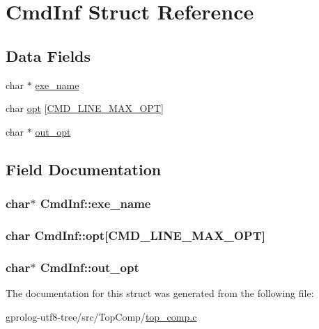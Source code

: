 \hypertarget{structCmdInf}{}\section{Cmd\+Inf Struct Reference}
\label{structCmdInf}
\subsection*{Data Fields}
\begin{DoxyCompactItemize}
\item 
char $\ast$ \hyperlink{structCmdInf_a08f467c4c99d5989d79d571d71eb91cc}{exe\+\_\+name}
\item 
char \hyperlink{structCmdInf_ad3011b5eb07e4f6bc735ba74f0061fb5}{opt} \mbox{[}\hyperlink{top__comp_8c_a3be28e77218549701fd7677b5d2d8b4b}{C\+M\+D\+\_\+\+L\+I\+N\+E\+\_\+\+M\+A\+X\+\_\+\+O\+PT}\mbox{]}
\item 
char $\ast$ \hyperlink{structCmdInf_a8810930cb97bd994d3d5a081222e9882}{out\+\_\+opt}
\end{DoxyCompactItemize}


\subsection{Field Documentation}
\subsubsection[{\texorpdfstring{exe\+\_\+name}{exe_name}}]{\setlength{\rightskip}{0pt plus 5cm}char$\ast$ Cmd\+Inf\+::exe\+\_\+name}\hypertarget{structCmdInf_a08f467c4c99d5989d79d571d71eb91cc}{}\label{structCmdInf_a08f467c4c99d5989d79d571d71eb91cc}
\subsubsection[{\texorpdfstring{opt}{opt}}]{\setlength{\rightskip}{0pt plus 5cm}char Cmd\+Inf\+::opt\mbox{[}{\bf C\+M\+D\+\_\+\+L\+I\+N\+E\+\_\+\+M\+A\+X\+\_\+\+O\+PT}\mbox{]}}\hypertarget{structCmdInf_ad3011b5eb07e4f6bc735ba74f0061fb5}{}\label{structCmdInf_ad3011b5eb07e4f6bc735ba74f0061fb5}
\subsubsection[{\texorpdfstring{out\+\_\+opt}{out_opt}}]{\setlength{\rightskip}{0pt plus 5cm}char$\ast$ Cmd\+Inf\+::out\+\_\+opt}\hypertarget{structCmdInf_a8810930cb97bd994d3d5a081222e9882}{}\label{structCmdInf_a8810930cb97bd994d3d5a081222e9882}


The documentation for this struct was generated from the following file\+:\begin{DoxyCompactItemize}
\item 
gprolog-\/utf8-\/tree/src/\+Top\+Comp/\hyperlink{top__comp_8c}{top\+\_\+comp.\+c}\end{DoxyCompactItemize}
